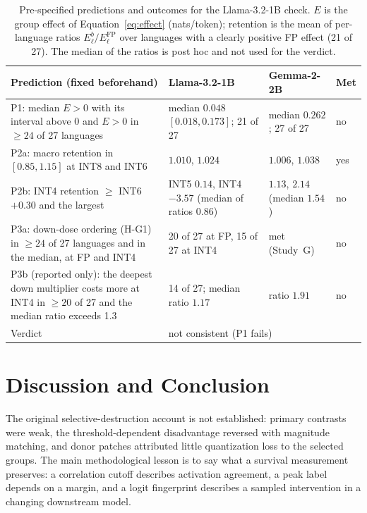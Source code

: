\begin{table}[t]
\centering\small
\begin{tabular}{p{4.2cm}p{4.9cm}p{3.5cm}p{1.1cm}}
\toprule
Prediction (fixed beforehand) & Llama-3.2-1B & Gemma-2-2B & Met\\
\midrule
P1: median $E>0$ with its interval above 0 and $E>0$ in $\geq 24$ of 27 languages & median $0.048$ $[0.018,0.173]$; 21 of 27 & median $0.262$; 27 of 27 & no\\
P2a: macro retention in $[0.85,1.15]$ at INT8 and INT6 & $1.010$, $1.024$ & $1.006$, $1.038$ & yes\\
P2b: INT4 retention $\geq$ INT6 $+0.30$ and the largest & INT5 $0.14$, INT4 $-3.57$ (median of ratios $0.86$) & $1.13$, $2.14$ (median $1.54$) & no\\
P3a: down-dose ordering (H-G1) in $\geq 24$ of 27 languages and in the median, at FP and INT4 & 20 of 27 at FP, 15 of 27 at INT4 & met (Study~G) & no\\
P3b (reported only): the deepest down multiplier costs more at INT4 in $\geq 20$ of 27 and the median ratio exceeds 1.3 & 14 of 27; median ratio $1.17$ & ratio $1.91$ & no\\
\midrule
Verdict & \multicolumn{3}{l}{not consistent (P1 fails)}\\
\bottomrule
\end{tabular}
\caption{Pre-specified predictions and outcomes for the Llama-3.2-1B check. $E$ is the group effect of Equation~\ref{eq:effect} (nats/token); retention is the mean of per-language ratios $E^b_\ell/E^{\mathrm{FP}}_\ell$ over languages with a clearly positive FP effect (21 of 27). The median of the ratios is post hoc and not used for the verdict.}
\label{tab:llama}
\end{table}

\section{Discussion and Conclusion}
The original selective-destruction account is not established: primary contrasts were weak, the threshold-dependent disadvantage reversed with magnitude matching, and donor patches attributed little quantization loss to the selected groups. The main methodological lesson is to say what a survival measurement preserves: a correlation cutoff describes activation agreement, a peak label depends on a margin, and a logit fingerprint describes a sampled intervention in a changing downstream model.

